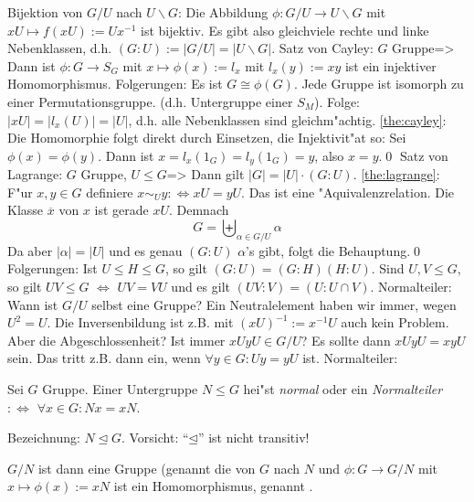 \remark Bijektion von $G/U$ nach $U\backslash G$:{
  Die Abbildung $\phi:G/U\to U\backslash G$ mit $xU\mapsto f(xU):=Ux^{-1}$ ist bijektiv.
  Es gibt also gleichviele rechte und linke Nebenklassen, d.h.
  $(G:U):=|G/U|=|U\backslash G|$.
  }
\theorem Satz von Cayley:
  $G$ Gruppe=>{
  \label{the:cayley}
  Dann ist $\phi:G\to S_G$ mit $x\mapsto \phi(x):=l_x$ mit $l_x(y):=xy$ ist ein
  injektiver Homomorphismus.
  }
\remark Folgerungen:{
  Es ist $G\cong \phi(G)$. Jede Gruppe ist isomorph zu einer Permutationsgruppe.
  (d.h. Untergruppe einer $S_M$). Folge: $|xU|=|l_x(U)|=|U|$, d.h.
  alle Nebenklassen sind gleichm"achtig.
  }
\proof \ref{the:cayley}:{
  Die Homomorphie folgt direkt durch Einsetzen, die Injektivit"at so:
  Sei $\phi(x)=\phi(y)$. Dann ist $x=l_x(1_G)=l_y(1_G)=y$, also $x=y$.\qed
  }
\theorem Satz von Lagrange:
  $G$ Gruppe, $U\leq G$=>{
  \label{the:lagrange}
  Dann gilt $|G|=|U|\cdot (G:U)$.
  }
\proof \ref{the:lagrange}:{
  F"ur $x,y\in G$ definiere $x\sim_U y:\iff xU=yU$. Das ist eine "Aquivalenzrelation.
  Die Klasse $\overline x$ von $x$ ist gerade $xU$.
  Demnach 
  \[G=\biguplus_{\alpha \in G/U} \alpha
    \]
  Da aber $|\alpha|=|U|$ und es genau $(G:U)$ $\alpha$'s gibt, folgt die Behauptung.\qed
  }
\remark Folgerungen:{
  Ist $U\leq H\leq G$, so gilt $(G:U)=(G:H)(H:U)$. Sind $U,V\leq G$, so gilt
  $UV\leq G$ $\iff $ $UV=VU$ und es gilt $(UV:V)=(U:U\cap V)$.
  }
\motivation Normalteiler:{
  Wann ist $G/U$ selbst eine Gruppe? Ein Neutralelement haben wir immer,
  wegen $U^2=U$. Die Inversenbildung ist z.B. mit $(xU)^{-1}:=x^{-1}U$ auch
  kein Problem. Aber die Abgeschlossenheit? Ist immer $xUyU\in G/U$?
  Es sollte dann $xUyU=xyU$ sein. Das tritt z.B. dann ein, wenn 
  $\forall y\in G:Uy=yU$ ist.
  }
 Normalteiler:{
  Sei $G$ Gruppe.
  Einer Untergruppe $N\leq G$ hei"st \emph{normal} oder ein \emph{Normalteiler}
  $:\iff $ $\forall x\in G:Nx=xN$.
  
  Bezeichnung: $N\unlhd G$. Vorsicht: ``$\unlhd$'' ist nicht transitiv!
  
  $G/N$ ist dann eine Gruppe (genannt die \emph{}
  von $G$ nach $N$ und $\phi:G\to G/N$ mit $x\mapsto \phi(x):=xN$ ist ein
  Homomorphismus, genannt \emph{}.
  }
